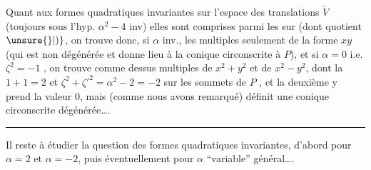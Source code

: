 Quant aux formes quadratiques invariantes  sur
l'espace des translations $\check V$ (toujours sous l'hyp.
$\alpha^2-4$ inv) elles sont comprises parmi les
 sur  (dont  quotient $\unsure{\}|)}$,
on trouve donc, si $\alpha$ inv., les multiples
seulement de la forme $xy$ (qui est non
dégénérée et donne lieu à la conique circonscrite
à $P$), et si $\alpha=0$ i.e. 
${\zeta}^2=-1$ , on trouve comme dessus 
multiples de $x^2+y^2$ et de $x^2-y^2$, dont
la 
$1+1=2$ et $\zeta^2+{\zeta'}^2=\alpha^2-2=-2$ sur les sommets
de $P$ , et la deuxième y prend la valeur $0$,
mais (comme nous avons remarqué) définit une
conique circonscrite dégénérée\ldots .

\begin{center}\rule{1.6cm}{0.3pt}\end{center}

Il reste à étudier la question des formes
quadratiques invariantes, d'abord pour $\alpha=2$
et $\alpha=-2$, puis éventuellement pour $\alpha$
``variable'' général\ldots .


